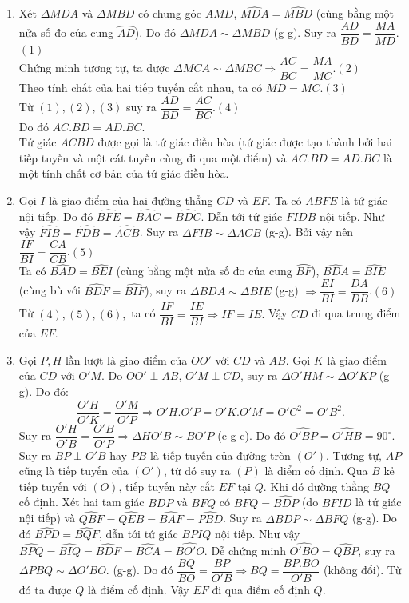 \begin{ex}
{   \begin{enumerate}
   	\item Xét $\Delta MDA$ và $\Delta MBD$ có chung góc $AMD$, $\widehat{MDA}=\widehat{MBD}$ (cùng bằng một nửa số đo của cung $\wideparen{AD}$). Do đó
   	$\Delta MDA\sim\Delta MBD$ (g-g). Suy ra 
   	$\dfrac{AD}{BD}=\dfrac{MA}{MD}$.\hfill$(1)$\\
   	Chứng minh tương tự, ta được $\Delta MCA\sim \Delta MBC\Rightarrow\dfrac{AC}{BC}=\dfrac{MA}{MC}$.\hfill$(2)$\\
   	Theo tính chất của hai tiếp tuyến cắt nhau, ta có $MD=MC$.\hfill$(3)$\\
   	Từ $(1),(2),(3)$ suy ra $\dfrac{AD}{BD}=\dfrac{AC}{BC}$.\hfill$(4)$\\
   	Do đó $ AC.BD=AD.BC$.\\
    Tứ giác $ACBD$ được gọi là tứ giác điều hòa (tứ giác được tạo thành bởi hai tiếp tuyến và một cát tuyến cùng đi qua một điểm) và $ AC.BD=AD.BC$ là một tính chất cơ bản của tứ giác điều hòa.
   	\item Gọi $I$ là giao điểm của hai đường thẳng $CD$ và $EF.$ Ta có $ABFE$ là tứ giác nội tiếp. Do đó
   	$\widehat{BFE}=\widehat{BAC}=\widehat{BDC}$. Dẫn tới  tứ giác $FIDB$ nội tiếp. Như vậy 
   	 $\widehat{FIB}=\widehat{FDB}=\widehat{ACB}$. Suy ra $\Delta FIB\sim \Delta ACB$ (g-g). Bởi vậy nên 
   	$\dfrac{IF}{BI}=\dfrac{CA}{CB}$.\hfill$(5)$\\
 Ta có $\widehat {BAD} = \widehat {BEI}$  (cùng bằng một nửa số đo của cung $\wideparen{BF}$), $\widehat {BDA} = \widehat {BIE}$  (cùng bù với $\widehat {BDF}=\widehat {BIF}$), suy ra $\Delta BDA\sim \Delta BIE$ (g-g) $\Rightarrow \dfrac{EI}{BI}=\dfrac{DA}{DB}$.\hfill$(6)$\\
   	Từ $(4),(5),(6),$ ta có $\dfrac{IF}{BI}=\dfrac{IE}{BI}\Rightarrow IF=IE.$
   	Vậy $CD$ đi qua trung điểm của $EF.$
   	\item Gọi $P,H$ lần lượt là giao điểm của $OO'$ với $CD$ và $AB.$ Gọi $K$ là giao điểm của $CD$ với $O'M.$
   	Do $OO'\perp AB$, $O'M\perp CD$, suy ra $\Delta O'HM\sim \Delta O'KP$ (g-g). Do đó:
   	$$\dfrac{O'H}{O'K}=\dfrac{O'M}{O'P}\Rightarrow O'H.O'P=O'K.O'M=O'C^2=O'B^2.$$
   	Suy ra $\dfrac{O'H}{O'B}=\dfrac{O'B}{O'P}\Rightarrow \Delta HO'B\sim BO'P$ (c-g-c). Do đó
   	$\widehat{O'BP}=\widehat{O'HB}=90^\circ$. Suy ra $BP\perp O'B$ hay $PB$ là tiếp tuyến của đường tròn $(O')$.
   	Tương tự, $AP$ cũng là tiếp tuyến của $(O')$, từ đó suy ra $(P)$ là điểm cố định. Qua $B$ kẻ tiếp tuyến với $(O)$, tiếp tuyến này cắt $EF$ tại $Q$. Khi đó  đường thẳng $BQ$ cố định.
   	Xét hai tam giác $BDP$ và $BFQ$ có $\widehat{BFQ}=\widehat{BDP}$ (do $BFID$ là tứ giác nội tiếp) và $\widehat{QBF}=\widehat{QEB}=\widehat{BAF}=\widehat{PBD}$. 
   Suy ra 	$\Delta BDP\sim \Delta BFQ$ (g-g). Do đó $\widehat{BPD}=\widehat{BQF}$, dẫn tới tứ giác $BPIQ$ nội tiếp.
 Như vậy  $\widehat{BPQ}=\widehat{BIQ}=\widehat{BDF}=\widehat{BCA}=\widehat{BO'O}.$
   	Dễ chứng minh $\widehat{O'BO}=\widehat{QBP}$,  suy ra $\Delta PBQ\sim\Delta O'BO.$ (g-g). Do đó
   	$\dfrac{BQ}{BO}=\dfrac{BP}{O'B}\Rightarrow BQ=\dfrac{BP.BO}{O'B}$ (không đổi).
   	Từ đó ta được $Q$ là điểm cố định. 
   	Vậy $EF$ đi qua điểm cố định $Q.$
   \end{enumerate}  

}
\end{ex}
